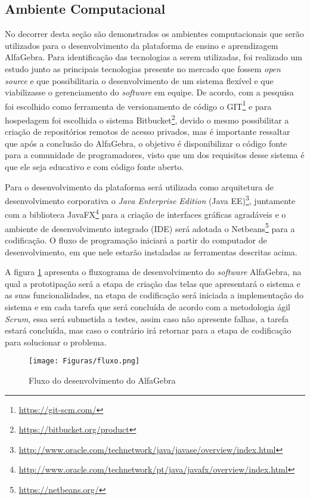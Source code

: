 \subsection{Ambiente Computacional}
\noindent No decorrer desta seção são demonstrados os ambientes computacionais que serão utilizados para o desenvolvimento da plataforma de ensino e aprendizagem AlfaGebra. Para identificação das tecnologias a serem utilizadas, foi realizado um estudo junto as principais tecnologias presente no mercado que fossem \textit{open source} e que possibilitaria o desenvolvimento de um sistema flexível e que viabilizasse o gerenciamento do \textit{software} em equipe. De acordo, com a pesquisa foi escolhido como ferramenta de versionamento de código o GIT\footnote[1]{\url{https://git-scm.com/}} e para hospedagem foi escolhida o sistema Bitbucket\footnote[2]{\url{https://bitbucket.org/product}}, devido o mesmo possibilitar a criação de repositórios remotos de acesso privados, mas é importante ressaltar que após a conclusão do AlfaGebra, o objetivo é disponibilizar o código fonte para a comunidade de programadores, visto que um dos requisitos desse sistema é que ele seja educativo e com código fonte aberto.

Para o desenvolvimento da plataforma será utilizada como arquitetura de desenvolvimento corporativa o \textit{Java Enterprise Edition} (Java EE)\footnote[3]{\url{http://www.oracle.com/technetwork/java/javase/overview/index.html}}, juntamente com a biblioteca JavaFX\footnote[4]{\url{http://www.oracle.com/technetwork/pt/java/javafx/overview/index.html}} para a criação de interfaces gráficas agradáveis e o ambiente de desenvolvimento integrado (IDE) será adotada o Netbeans\footnote[5]{\url{https://netbeans.org/}} para a codificação. O fluxo de programação iniciará a partir do computador de desenvolvimento, em que nele estarão instaladas as ferramentas descritas acima.

A figura \ref{fluxograma} apresenta o fluxograma de desenvolvimento do \textit{software} AlfaGebra, na qual a prototipação será a etapa de criação das telas que apresentará o sistema e as suas funcionalidades, na etapa de codificação será iniciada a implementação do sistema e em cada tarefa que será concluída de acordo com a metodologia ágil \textit{Scrum}, essa será submetida a testes, assim caso não apresente falhas, a tarefa estará concluída, mas caso o contrário irá retornar para a etapa de codificação para solucionar o problema.

\begin{figure}[!htb]
  \centering 
  \texttt{[image: Figuras/fluxo.png]}
  \caption{Fluxo do desenvolvimento do AlfaGebra}
  \label{fluxograma}
\end{figure}

